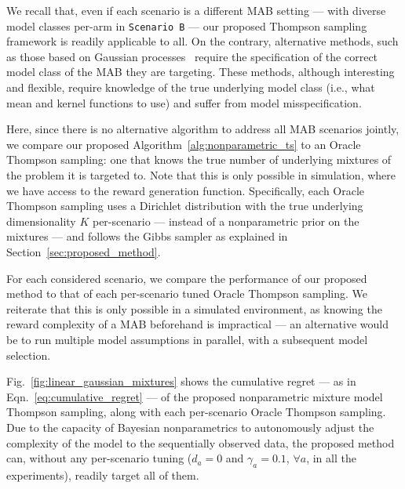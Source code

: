 \documentclass{article}
\newcommand{\ie}{i.e., }
\begin{document}
We recall that, even if each scenario is a different MAB setting --- with diverse model classes per-arm in \texttt{Scenario B} --- our proposed Thompson sampling framework is readily applicable to all. On the contrary, alternative methods, such as those based on Gaussian processes~\cite{ip-Srinivas2010,ip-Gruenewaelder2010,ic-Krause2011} require the specification of the correct model class of the MAB they are targeting. These methods, although interesting and flexible, require knowledge of the true underlying model class (\ie what mean and kernel functions to use) and suffer from model misspecification. 

Here, since there is no alternative algorithm to address all MAB scenarios jointly, we compare our proposed Algorithm~\ref{alg:nonparametric_ts} to an Oracle Thompson sampling: one that knows the true number of underlying mixtures of the problem it is targeted to. Note that this is only possible in simulation, where we have access to the reward generation function. Specifically, each Oracle Thompson sampling uses a Dirichlet distribution with the true underlying dimensionality $K$ per-scenario --- instead of a nonparametric prior on the mixtures --- and follows the Gibbs sampler as explained in Section~\ref{sec:proposed_method}.

For each considered scenario, we compare the performance of our proposed method to that of each per-scenario tuned Oracle Thompson sampling. We reiterate that this is only possible in a simulated environment, as knowing the reward complexity of a MAB beforehand is impractical --- an alternative would be to run multiple model assumptions in parallel, with a subsequent model selection.

Fig.~\ref{fig:linear_gaussian_mixtures} shows the cumulative regret --- as in Eqn.~\eqref{eq:cumulative_regret} --- of the proposed nonparametric mixture model Thompson sampling, along with each per-scenario Oracle Thompson sampling. Due to the capacity of Bayesian nonparametrics to autonomously adjust the complexity of the model to the sequentially observed data, the proposed method can, without any per-scenario tuning  ($d_a=0$ and $\gamma_a=0.1$, $\forall a$, in all the experiments), readily target all of them. 
\end{document}
